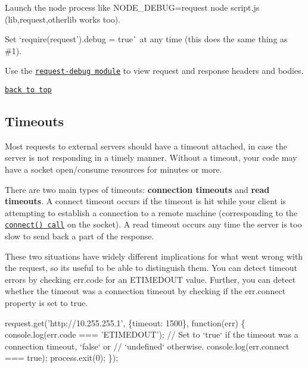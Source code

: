 \begin{DoxyEnumerate}
\item Launch the node process like {\ttfamily N\+O\+D\+E\+\_\+\+D\+E\+B\+UG=request node script.\+js} ({\ttfamily lib,request,otherlib} works too).
\item Set `require(\textquotesingle{}request').debug = true\`{} at any time (this does the same thing as \#1).
\item Use the \href{https://github.com/request/request-debug}{\tt request-\/debug module} to view request and response headers and bodies.
\end{DoxyEnumerate}

\href{#table-of-contents}{\tt back to top}





\subsection*{Timeouts}

Most requests to external servers should have a timeout attached, in case the server is not responding in a timely manner. Without a timeout, your code may have a socket open/consume resources for minutes or more.

There are two main types of timeouts\+: {\bfseries connection timeouts} and {\bfseries read timeouts}. A connect timeout occurs if the timeout is hit while your client is attempting to establish a connection to a remote machine (corresponding to the \href{http://linux.die.net/man/2/connect}{\tt connect() call} on the socket). A read timeout occurs any time the server is too slow to send back a part of the response.

These two situations have widely different implications for what went wrong with the request, so it\textquotesingle{}s useful to be able to distinguish them. You can detect timeout errors by checking {\ttfamily err.\+code} for an \textquotesingle{}E\+T\+I\+M\+E\+D\+O\+UT\textquotesingle{} value. Further, you can detect whether the timeout was a connection timeout by checking if the {\ttfamily err.\+connect} property is set to {\ttfamily true}.


\begin{DoxyCode}
request.get('http://10.255.255.1', \{timeout: 1500\}, function(err) \{
    console.log(err.code === 'ETIMEDOUT');
    // Set to `true` if the timeout was a connection timeout, `false` or
    // `undefined` otherwise.
    console.log(err.connect === true);
    process.exit(0);
\});
\end{DoxyCode}


